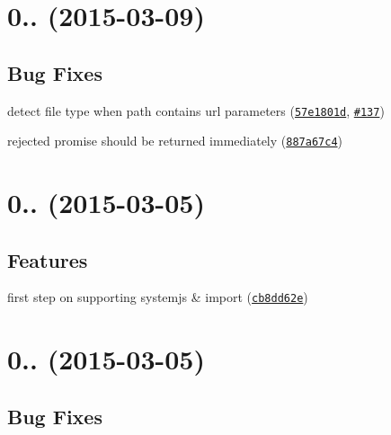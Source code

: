 \label{_0.6.3}%
 \section*{0.. (2015-\/03-\/09)}

\subsection*{Bug Fixes}


\begin{DoxyItemize}
\item detect file type when path contains url parameters (\href{https://github.com/ocombe/ocLazyLoad/commit/57e1801d933f978060954bd8707f586b51544906}{\tt 57e1801d}, \href{https://github.com/ocombe/ocLazyLoad/issues/137}{\tt \#137})
\item rejected promise should be returned immediately (\href{https://github.com/ocombe/ocLazyLoad/commit/887a67c4196fa4bbd65c34f6eba1d8b2bca9fed3}{\tt 887a67c4})
\end{DoxyItemize}

\label{_0.6.2}%
 \section*{0.. (2015-\/03-\/05)}

\subsection*{Features}


\begin{DoxyItemize}
\item first step on supporting systemjs \& import (\href{https://github.com/ocombe/ocLazyLoad/commit/cb8dd62ed9052995cbaf132d94092d1d103dd74d}{\tt cb8dd62e})
\end{DoxyItemize}

\label{_0.6.1}%
 \section*{0.. (2015-\/03-\/05)}

\subsection*{Bug Fixes}


